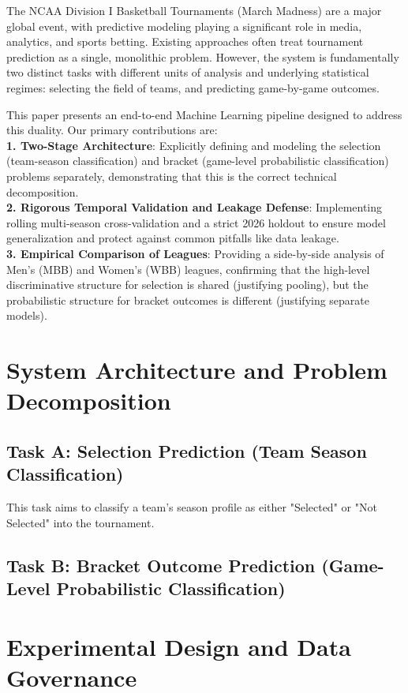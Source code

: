 \documentclass[runningheads]{llncs}
\begin{document}
The NCAA Division I Basketball Tournaments (March Madness) are a major global event, with predictive modeling playing a significant role in media, analytics, and sports betting. Existing approaches often treat tournament prediction as a single, monolithic problem. However, the system is fundamentally two distinct tasks with different units of analysis and underlying statistical regimes: selecting the field of teams, and predicting game-by-game outcomes.

This paper presents an end-to-end Machine Learning pipeline designed to address this duality. Our primary contributions are: \\
\textbf{1. Two-Stage Architecture}: Explicitly defining and modeling the selection (team-season classification) and bracket (game-level probabilistic classification) problems separately, demonstrating that this is the correct technical decomposition. \\
\textbf{2. Rigorous Temporal Validation and Leakage Defense}: Implementing rolling multi-season cross-validation and a strict 2026 holdout to ensure model generalization and protect against common pitfalls like data leakage. \\
\textbf{3. Empirical Comparison of Leagues}: Providing a side-by-side analysis of Men’s (MBB) and Women’s (WBB) leagues, confirming that the high-level discriminative structure for selection is shared (justifying pooling), but the probabilistic structure for bracket outcomes is different (justifying separate models). \\


\section{System Architecture and Problem Decomposition}
\subsection{Task A: Selection Prediction (Team Season Classification)}
This task aims to classify a team's season profile as either "Selected" or "Not Selected" into the tournament.

\subsection{Task B: Bracket Outcome Prediction (Game-Level Probabilistic Classification)} 

\section{Experimental Design and Data Governance}
\end{document}
